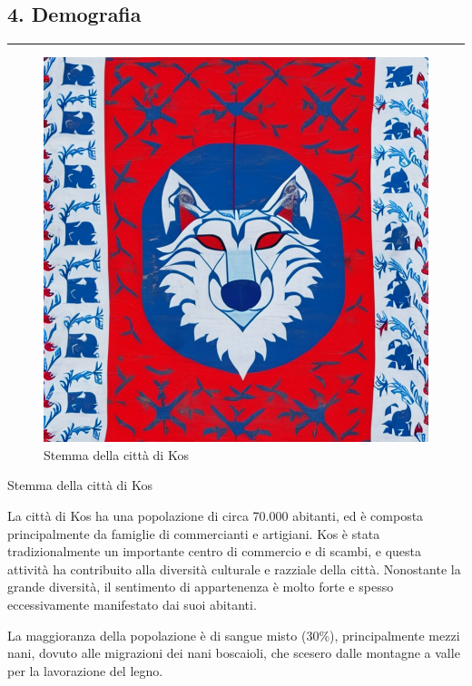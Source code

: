 \subsection{4. Demografia}\label{demografia}

\begin{center}\rule{0.5\linewidth}{0.5pt}\end{center}

\begin{figure}
\centering
\includegraphics{a-medieval-banner-blue-and-red-colours-depicting-a-wolf-.png}
\caption{Stemma della città di Kos}
\end{figure}

Stemma della città di Kos

La città di Kos ha una popolazione di circa 70.000 abitanti, ed è
composta principalmente da famiglie di commercianti e artigiani. Kos è
stata tradizionalmente un importante centro di commercio e di scambi, e
questa attività ha contribuito alla diversità culturale e razziale della
città. Nonostante la grande diversità, il sentimento di appartenenza è
molto forte e spesso eccessivamente manifestato dai suoi abitanti.

La maggioranza della popolazione è di sangue misto (30\%),
principalmente mezzi nani, dovuto alle migrazioni dei nani boscaioli,
che scesero dalle montagne a valle per la lavorazione del legno.

